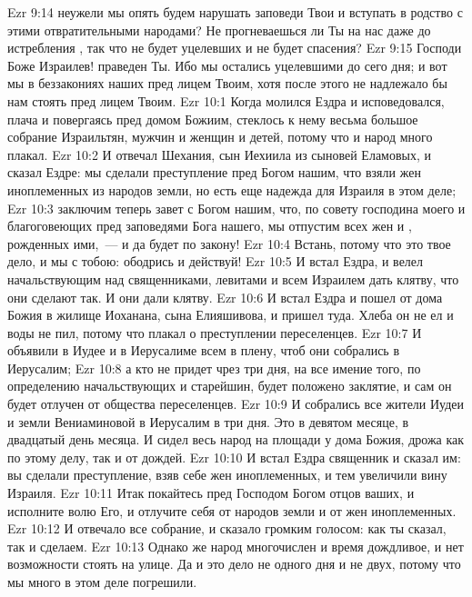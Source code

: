 \vs Ezr 9:14 неужели мы опять будем нарушать заповеди Твои и вступать в родство с этими отвратительными народами? Не прогневаешься ли Ты на нас даже до истребления , так что не будет уцелевших и не будет спасения?
\vs Ezr 9:15 Господи Боже Израилев! праведен Ты. Ибо мы остались уцелевшими до сего дня; и вот мы в беззакониях наших пред лицем Твоим, хотя после этого не надлежало бы нам стоять пред лицем Твоим.
\vs Ezr 10:1 Когда  молился Ездра и исповедовался, плача и повергаясь пред домом Божиим, стеклось к нему весьма большое собрание Израильтян, мужчин и женщин и детей, потому что и народ много плакал.
\vs Ezr 10:2 И отвечал Шехания, сын Иехиила из сыновей Еламовых, и сказал Ездре: мы сделали преступление пред Богом нашим, что взяли  жен иноплеменных из народов земли, но есть еще надежда для Израиля в этом деле;
\vs Ezr 10:3 заключим теперь завет с Богом нашим, что, по совету господина моего и благоговеющих пред заповедями Бога нашего, мы отпустим  всех жен и , рожденных ими,~--- и да будет по закону!
\vs Ezr 10:4 Встань, потому что это твое дело, и мы с тобою: ободрись и действуй!
\vs Ezr 10:5 И встал Ездра, и велел начальствующим над священниками, левитами и всем Израилем дать клятву, что они сделают так. И они дали клятву.
\vs Ezr 10:6 И встал Ездра и пошел от дома Божия в жилище Иоханана, сына Елияшивова, и пришел туда. Хлеба он не ел и воды не пил, потому что плакал о преступлении переселенцев.
\rsbpar\vs Ezr 10:7 И объявили в Иудее и в Иерусалиме всем  в плену, чтоб они собрались в Иерусалим;
\vs Ezr 10:8 а кто не придет чрез три дня, на все имение того, по определению начальствующих и старейшин, будет положено заклятие, и сам он будет отлучен от общества переселенцев.
\vs Ezr 10:9 И собрались все жители Иудеи и земли Вениаминовой в Иерусалим в три дня. Это  в девятом месяце, в двадцатый день месяца. И сидел весь народ на площади у дома Божия, дрожа как по этому делу, так и от дождей.
\vs Ezr 10:10 И встал Ездра священник и сказал им: вы сделали преступление, взяв себе жен иноплеменных, и тем увеличили вину Израиля.
\vs Ezr 10:11 Итак покайтесь  пред Господом Богом отцов ваших, и исполните волю Его, и отлучите себя от народов земли и от жен иноплеменных.
\vs Ezr 10:12 И отвечало все собрание, и сказало громким голосом: как ты сказал, так и сделаем.
\vs Ezr 10:13 Однако же народ многочислен и время  дождливое, и нет возможности стоять на улице. Да и это дело не одного дня и не двух, потому что мы много в этом деле погрешили.
